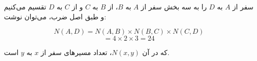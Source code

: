 \p
سفر از
$A$
به
$D$
را به سه بخش سفر از
$A$
به
$B$،
از
$B$
به
$C$
و از
$C$
به
$D$
تقسیم می‌کنیم و طبق اصل ضرب، می‌توان نوشت:

$$N(A,D) = N(A,B) \times N(B,C) \times N(C,D)$$
$$= 4 \times 2 \times 3 = 24$$

که در آن
$N(x,y)$،
تعداد مسیر‌های سفر از $x$ به $y$ است.